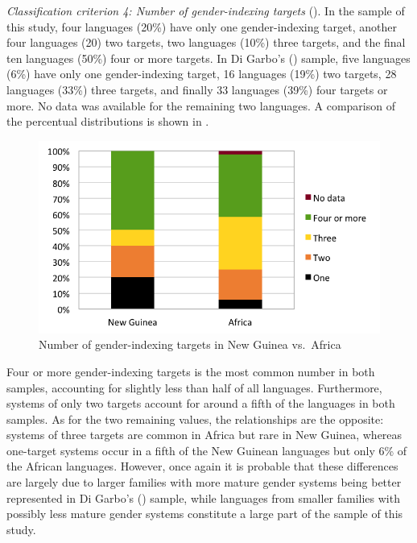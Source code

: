 \documentclass[output=collectionpaper]{langsci/langscibook}
\begin{document}
\textit{Classification criterion 4: Number of gender-indexing targets} ().
In the sample of this study, four languages (20\%) have only one gender-indexing target, another four languages (20) two targets, two languages (10\%) three targets, and the final ten languages (50\%) four or more targets. In Di Garbo's (\citeyear[68]{DiGarbo2014}) sample, five languages (6\%) have only one gender-indexing target, 16 languages (19\%) two targets, 28 languages (33\%) three targets, and finally 33 languages (39\%) four targets or more. No data was available for the remaining two languages. A comparison of the percentual distributions is shown in .


\begin{figure}
\includegraphics[width=.8\textwidth]{figures/09/fig10.png}
\caption{Number of gender-indexing targets in New Guinea vs.\ Africa}
\label{fig:Svard:10}


\end{figure}

Four or more gender-indexing targets is the most common number in both samples, accounting for slightly less than half of all languages. Furthermore, systems of only two targets account for around a fifth of the languages in both samples. As for the two remaining values, the relationships are the opposite: systems of three targets are common in Africa but rare in New Guinea, whereas one-target systems occur in a fifth of the New Guinean languages but only 6\% of the African languages. However, once again it is probable that these differences are largely due to larger families with more mature gender systems being better represented in Di Garbo's (\citeyear{DiGarbo2014}) sample, while languages from smaller families with possibly less mature gender systems constitute a large part of the sample of this study.
\end{document}
